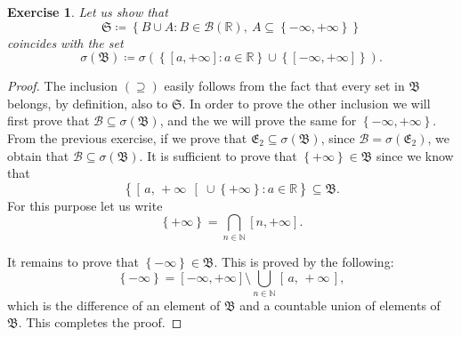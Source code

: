 \documentclass[12pt,a4paper]{article} %
\theoremstyle{plain}
\newtheorem{exercise}{Exercise}
\newcommand\icc[2]{\ensuremath{\left[\,#1,\,#2\,\right]}}
\newcommand\ico[2]{\ensuremath{\left[\,#1,\,#2\,\right[}}
\begin{document}
\begin{exercise}
  Let us show that
  \begin{equation*}
    \mathfrak{S} \coloneqq \left\lbrace B \cup A \colon B \in \mathcal{B}(\mathbb{R}),\ A \subseteq \left\lbrace -\infty, +\infty\right\rbrace\right\rbrace
  \end{equation*}
  coincides with the set
  \begin{equation*}
    \sigma(\mathfrak{B}) \coloneqq \sigma\left(\left\lbrace[a,+\infty] : a \in \mathbb{R}\right\rbrace \cup \left\lbrace[-\infty,+\infty]\right\rbrace\right).
  \end{equation*}
\end{exercise}
\begin{proof}
  The inclusion $(\supseteq)$ easily follows from the fact that every set in $\mathfrak{B}$ belongs, by definition, also to $\mathfrak{S}$.
  In order to prove the other inclusion we will first prove that $\mathcal{B} \subseteq \sigma(\mathfrak{B})$, and the we will prove the same for $\left\lbrace -\infty, +\infty\right\rbrace$.
  From the previous exercise, if we prove that $\mathfrak{E_2} \subseteq \sigma(\mathfrak{B})$, since $\mathcal{B} = \sigma(\mathfrak{E_2})$, we obtain that $\mathcal{B} \subseteq \sigma(\mathfrak{B})$.
  It is sufficient to prove that $\left\lbrace +\infty\right\rbrace \in \mathfrak{B}$ since we know that
  \begin{equation*}
    \left\lbrace \ico{a}{+\infty} \cup \left\lbrace +\infty\right\rbrace \colon a \in \mathbb{R}\right\rbrace \subseteq \mathfrak{B}.
  \end{equation*}
  For this purpose let us write
  \begin{equation*}
    \left\lbrace+\infty\right\rbrace = \bigcap_{n \in \mathbb{N}}[n,+\infty].
  \end{equation*}

  It remains to prove that $\left\lbrace -\infty\right\rbrace \in \mathfrak{B}$.
  This is proved by the following:
  \begin{equation*}
    \left\lbrace-\infty\right\rbrace = [-\infty,+\infty] \setminus \bigcup_{n \in \mathbb{N}}\icc{a}{+\infty},
  \end{equation*}
  which is the difference of an element of $\mathfrak{B}$ and a countable union of elements of $\mathfrak{B}$.
  This completes the proof.
\end{proof}
\end{document}
